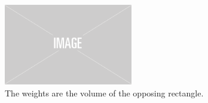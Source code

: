 



\begin{figure}
    \centering
    \includegraphics[width=0.5\textwidth]{figures/img-placeholder.png}
    \caption{The weights are the volume of the opposing rectangle.}
    \label{fig:bilinear}
\end{figure}


